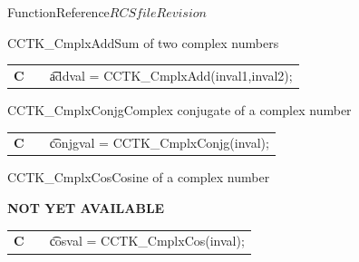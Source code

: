 \begin{cactuspart}{FunctionReference}{$RCSfile$}{$Revision$}
\begin{CCTKFunc}{CCTK\_CmplxAdd}{Sum of two complex numbers}
\label{CCTK-CmplxAdd}
\showcargs
\begin{params}
\end{params}
\begin{discussion}
\end{discussion}
\begin{examples}
\begin{tabular}{@{}p{3cm}cp{11cm}}
\hfill {\bf C} && {\t addval = CCTK\_CmplxAdd(inval1,inval2)};
\end{tabular}
\end{examples}
\begin{errorcodes}
\end{errorcodes}
\end{CCTKFunc}

\begin{CCTKFunc}{CCTK\_CmplxConjg}{Complex conjugate of a complex number}
\label{CCTK-CmplxConjg}
\showcargs
\begin{params}
\end{params}
\begin{discussion}
\end{discussion}
\begin{examples}
\begin{tabular}{@{}p{3cm}cp{11cm}}
\hfill {\bf C} && {\t conjgval = CCTK\_CmplxConjg(inval)};
\end{tabular}
\end{examples}
\begin{errorcodes}
\end{errorcodes}
\end{CCTKFunc}

\begin{CCTKFunc}{CCTK\_CmplxCos}{Cosine of a complex number}
\label{CCTK-CmplxCos}
\showcargs
\begin{params}
\end{params}
\begin{discussion}
{\bf NOT YET AVAILABLE}
\end{discussion}
\begin{examples}
\begin{tabular}{@{}p{3cm}cp{11cm}}
\hfill {\bf C} && {\t cosval = CCTK\_CmplxCos(inval)};
\end{tabular}
\end{examples}
\begin{errorcodes}
\end{errorcodes}
\end{CCTKFunc}



\end{cactuspart}
